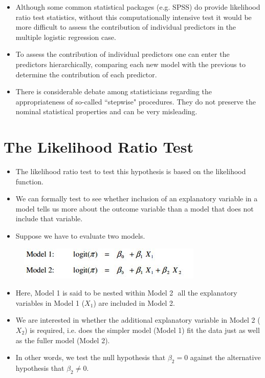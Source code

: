 \documentclass[a4paper,12pt]{article}
\begin{document}
\begin{itemize}
\item Although some common statistical packages (e.g. SPSS) do provide likelihood ratio test statistics, without this computationally intensive test it would be more difficult to assess the contribution of individual predictors in the multiple logistic regression case. 
\item To assess the contribution of individual predictors one can enter the predictors hierarchically, comparing each new model with the previous to determine the contribution of each predictor.
\item There is considerable debate among statisticians regarding the appropriateness of so-called ``stepwise" procedures. They do not preserve the nominal statistical properties and can be very misleading.
\end{itemize}






	
\newpage	
\section*{The Likelihood Ratio Test}
\begin{itemize}
	\item The likelihood ratio test to test this hypothesis is based on the likelihood
	function.
	\item  We can formally test to see whether inclusion of an explanatory variable in a model tells us
	more about the outcome variable than a model that does not include that variable.
	\item  Suppose
	we have to evaluate two models. 
\end{itemize}


\begin{center}
\begin{figure}[h!]
	\centering
\includegraphics[scale=0.6]{images/LogWeek10D}\\

\end{figure}
\end{center}
\begin{itemize}
\item Here, Model 1 is said to be nested within Model 2  all the explanatory variables in Model 1
($X_1$) are included in Model 2. 
\item We are interested in whether the additional explanatory
variable in Model 2 ($X_2$) is required, i.e. does the simpler model (Model 1) fit the data just as
well as the fuller model (Model 2). 
\item In other words, we test the null hypothesis that $\beta_2 = 0$
against the alternative hypothesis that $\beta_2 \neq 0$. 
\end{itemize}
\end{document}
